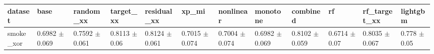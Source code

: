 \begin{tabular}{llllllllllll}
\toprule
dataset & base & random\_xx & target\_xx & residual\_xx & xp\_mi & nonlinear & monotone & combined & rf & rf\_target\_xx & lightgbm \\
\midrule
smoke\_xor & 0.6982 $\pm$ 0.069 & 0.7592 $\pm$ 0.061 & 0.8113 $\pm$ 0.06 & 0.8124 $\pm$ 0.061 & 0.7015 $\pm$ 0.074 & 0.7004 $\pm$ 0.074 & 0.6982 $\pm$ 0.069 & 0.8102 $\pm$ 0.059 & 0.6714 $\pm$ 0.07 & 0.8035 $\pm$ 0.067 & 0.778 $\pm$ 0.05 \\
\bottomrule
\end{tabular}
